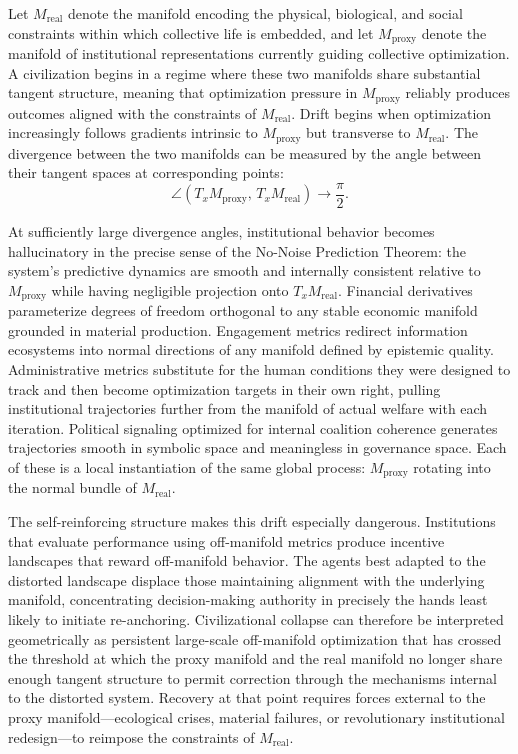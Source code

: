 \documentclass[11pt,a4paper,twocolumn]{article}
\begin{document}
Let $M_{\mathrm{real}}$ denote the manifold encoding the
physical, biological, and social constraints within which
collective life is embedded, and let $M_{\mathrm{proxy}}$
denote the manifold of institutional representations currently
guiding collective optimization. A civilization begins in a
regime where these two manifolds share substantial tangent
structure, meaning that optimization pressure in $M_{\mathrm{proxy}}$
reliably produces outcomes aligned with the constraints of
$M_{\mathrm{real}}$. Drift begins when optimization increasingly
follows gradients intrinsic to $M_{\mathrm{proxy}}$ but transverse
to $M_{\mathrm{real}}$. The divergence between the two manifolds
can be measured by the angle between their tangent spaces at
corresponding points:
\[
\angle\!\left(
T_x M_{\mathrm{proxy}},\,
T_x M_{\mathrm{real}}
\right)
\to \frac{\pi}{2}.
\]

At sufficiently large divergence angles, institutional behavior
becomes hallucinatory in the precise sense of the No-Noise
Prediction Theorem: the system's predictive dynamics are smooth
and internally consistent relative to $M_{\mathrm{proxy}}$ while
having negligible projection onto $T_x M_{\mathrm{real}}$.
Financial derivatives parameterize degrees of freedom orthogonal
to any stable economic manifold grounded in material production.
Engagement metrics redirect information ecosystems into normal
directions of any manifold defined by epistemic quality.
Administrative metrics substitute for the human conditions they
were designed to track and then become optimization targets in
their own right, pulling institutional trajectories further from
the manifold of actual welfare with each iteration. Political
signaling optimized for internal coalition coherence generates
trajectories smooth in symbolic space and meaningless in
governance space. Each of these is a local instantiation of
the same global process: $M_{\mathrm{proxy}}$ rotating into
the normal bundle of $M_{\mathrm{real}}$.

The self-reinforcing structure makes this drift especially
dangerous. Institutions that evaluate performance using
off-manifold metrics produce incentive landscapes that reward
off-manifold behavior. The agents best adapted to the distorted
landscape displace those maintaining alignment with the
underlying manifold, concentrating decision-making authority
in precisely the hands least likely to initiate re-anchoring.
Civilizational collapse can therefore be interpreted geometrically
as persistent large-scale off-manifold optimization that has
crossed the threshold at which the proxy manifold and the real
manifold no longer share enough tangent structure to permit
correction through the mechanisms internal to the distorted
system. Recovery at that point requires forces external to
the proxy manifold---ecological crises, material failures,
or revolutionary institutional redesign---to reimpose the
constraints of $M_{\mathrm{real}}$.
\end{document}
